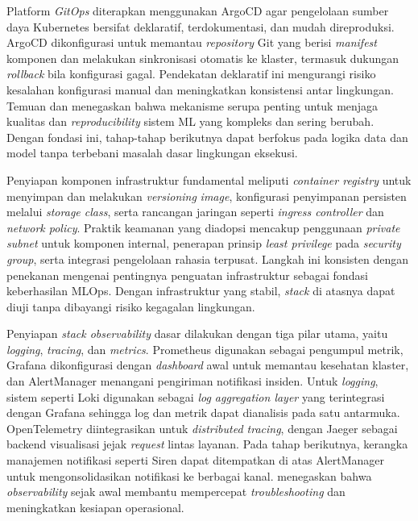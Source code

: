 Platform \textit{GitOps} diterapkan menggunakan ArgoCD agar pengelolaan sumber daya Kubernetes bersifat deklaratif, terdokumentasi, dan mudah direproduksi. ArgoCD dikonfigurasi untuk memantau \textit{repository} Git yang berisi \textit{manifest} komponen dan melakukan sinkronisasi otomatis ke klaster, termasuk dukungan \textit{rollback} bila konfigurasi gagal. Pendekatan deklaratif ini mengurangi risiko kesalahan konfigurasi manual dan meningkatkan konsistensi antar lingkungan. Temuan \textcite{polyzotis2018data} dan \textcite{paleyes2022challenges} menegaskan bahwa mekanisme serupa penting untuk menjaga kualitas dan \textit{reproducibility} sistem ML yang kompleks dan sering berubah. Dengan fondasi ini, tahap-tahap berikutnya dapat berfokus pada logika data dan model tanpa terbebani masalah dasar lingkungan eksekusi.

Penyiapan komponen infrastruktur fundamental meliputi \textit{container registry} untuk menyimpan dan melakukan \textit{versioning} \textit{image}, konfigurasi penyimpanan persisten melalui \textit{storage class}, serta rancangan jaringan seperti \textit{ingress controller} dan \textit{network policy}. Praktik keamanan yang diadopsi mencakup penggunaan \textit{private subnet} untuk komponen internal, penerapan prinsip \textit{least privilege} pada \textit{security group}, serta integrasi pengelolaan rahasia terpusat. Langkah ini konsisten dengan penekanan \textcite{ahmad2024mlops} mengenai pentingnya penguatan infrastruktur sebagai fondasi keberhasilan MLOps. Dengan infrastruktur yang stabil, \textit{stack} di atasnya dapat diuji tanpa dibayangi risiko kegagalan lingkungan.

Penyiapan \textit{stack observability} dasar dilakukan dengan tiga pilar utama, yaitu \textit{logging}, \textit{tracing}, dan \textit{metrics}. Prometheus digunakan sebagai pengumpul metrik, Grafana dikonfigurasi dengan \textit{dashboard} awal untuk memantau kesehatan klaster, dan AlertManager menangani pengiriman notifikasi insiden. Untuk \textit{logging}, sistem seperti Loki digunakan sebagai \textit{log aggregation layer} yang terintegrasi dengan Grafana sehingga log dan metrik dapat dianalisis pada satu antarmuka. OpenTelemetry diintegrasikan untuk \textit{distributed tracing}, dengan Jaeger sebagai backend visualisasi jejak \textit{request} lintas layanan. Pada tahap berikutnya, kerangka manajemen notifikasi seperti Siren dapat ditempatkan di atas AlertManager untuk mengonsolidasikan notifikasi ke berbagai kanal. \textcite{shankar2022operationalizing} menegaskan bahwa \textit{observability} sejak awal membantu mempercepat \textit{troubleshooting} dan meningkatkan kesiapan operasional.

